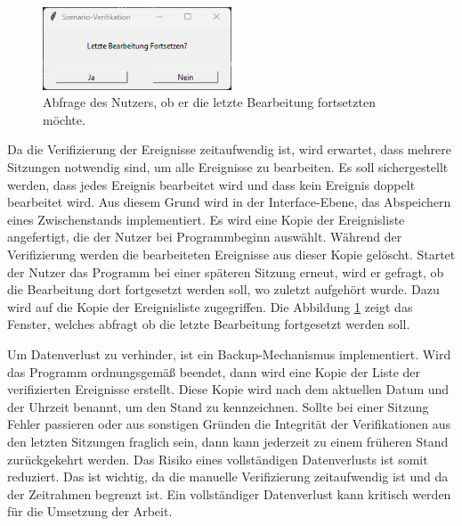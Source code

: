 \begin{figure}
    \begin{center}
        \vspace*{-9mm}
        \includegraphics[width=0.5\textwidth]{img/Verifikationstool/Verifikation Abfrage Letze Bearbeitung fortsetzen.png}
        \vspace*{-10mm}
        \caption{Abfrage des Nutzers, ob er die letzte Bearbeitung fortsetzten möchte.}
        \label{fig:VeriBearbFortsetz}
    \end{center}
\end{figure}
Da die Verifizierung der Ereignisse zeitaufwendig ist, wird erwartet, dass mehrere Sitzungen notwendig sind, um alle Ereignisse zu bearbeiten. Es soll sichergestellt werden, dass jedes Ereignis bearbeitet wird und dass kein Ereignis doppelt bearbeitet wird. Aus diesem Grund wird in der Interface-Ebene, das Abspeichern eines Zwischenstands implementiert. Es wird eine Kopie der Ereignisliste angefertigt, die der Nutzer bei Programmbeginn auswählt. Während der Verifizierung werden die bearbeiteten Ereignisse aus dieser Kopie gelöscht. Startet der Nutzer das Programm bei einer späteren Sitzung erneut, wird er gefragt, ob die Bearbeitung dort fortgesetzt werden soll, wo zuletzt aufgehört wurde. Dazu wird auf die Kopie der Ereignisliste zugegriffen. Die Abbildung \ref{fig:VeriBearbFortsetz} zeigt das Fenster, welches abfragt ob die letzte Bearbeitung fortgesetzt werden soll. \par

Um Datenverlust zu verhinder, ist ein Backup-Mechanismus implementiert. Wird das Programm ordnungsgemäß beendet, dann wird eine Kopie der Liste der verifizierten Ereignisse erstellt. Diese Kopie wird nach dem aktuellen Datum und der Uhrzeit benannt, um den Stand zu kennzeichnen. Sollte bei einer Sitzung Fehler passieren oder aus sonstigen Gründen die Integrität der Verifikationen aus den letzten Sitzungen fraglich sein, dann kann jederzeit zu einem früheren Stand zurückgekehrt werden. Das Risiko eines vollständigen Datenverlusts ist somit reduziert. Das ist wichtig, da die manuelle Verifizierung zeitaufwendig ist und da der Zeitrahmen begrenzt ist. Ein vollständiger Datenverlust kann kritisch werden für die Umsetzung der Arbeit. 